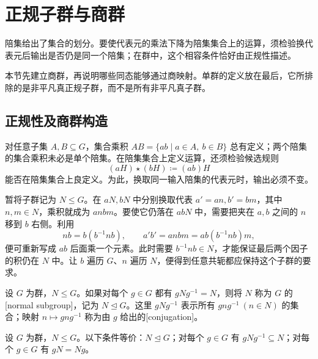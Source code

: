 
\section{正规子群与商群}
\label{b1:sec:0203}

%
%

陪集给出了集合的划分。要使代表元的乘法下降为陪集集合上的运算，须检验换代表元后输出是否仍是同一个陪集；在群中，这个相容条件恰好由正规性描述。

\ProseParagraphBreak
本节先建立商群，再说明哪些同态能够通过商映射。单群的定义放在最后，它所排除的是非平凡真正规子群，而不是所有非平凡真子群。

\subsection{正规性及商群构造}
\label{b1:subsec:0203:01}

对任意子集 \(A,B\subseteq G\)，集合乘积 \(AB=\{ab\mid a\in A,\ b\in B\}\) 总有定义；两个陪集的集合乘积未必是单个陪集。在陪集集合上定义运算，还须检验候选规则
\[
	(aH)\star(bH)\coloneqq(ab)H
\]
能否在陪集集合上良定义。为此，换取同一输入陪集的代表元时，输出必须不变。

\ProseParagraphBreak
暂将子群记为 \(N\leq G\)。在 \(aN,bN\) 中分别换取代表 \(a'=an,b'=bm\)，其中 \(n,m\in N\)，乘积就成为 \(anbm\)。要使它仍落在 \(abN\) 中，需要把夹在 \(a,b\) 之间的 \(n\) 移到 \(b\) 右侧。利用
\[
	nb=b(b^{-1}nb),\qquad a'b'=anbm=ab(b^{-1}nb)m,
\]
便可重新写成 \(ab\) 后面乘一个元素。此时需要 \(b^{-1}nb\in N\)，才能保证最后两个因子的积仍在 \(N\) 中。让 \(b\) 遍历 \(G\)、\(n\) 遍历 \(N\)，便得到任意共轭都应保持这个子群的要求。

\begin{definition}\label{b1:def:normal-subgroup}
	设 \(G\) 为群，\(N\leq G\)。如果对每个 \(g\in G\) 都有 \(gNg^{-1}=N\)，则将 \(N\) 称为 \(G\) 的[normal subgroup]，记为 \(N\trianglelefteq G\)。这里 \(gNg^{-1}\) 表示所有 \(gng^{-1}\ (n\in N)\) 的集合；映射 \(n\mapsto gng^{-1}\) 称为由 \(g\) 给出的[conjugation]。
\end{definition}


\begin{proposition}\label{b1:prop:normal-criteria}
	设 \(G\) 为群，\(N\leq G\)。以下条件等价：\(N\trianglelefteq G\)；对每个 \(g\in G\) 有 \(gNg^{-1}\subseteq N\)；对每个 \(g\in G\) 有 \(gN=Ng\)。
\end{proposition}

